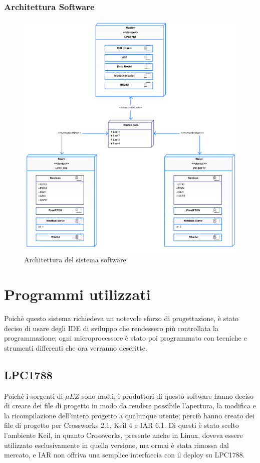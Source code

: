 \documentclass[a4paper,titlepage]{book}
\begin{document}
\subsection{Architettura Software}
\begin{figure}[!h]
\centering
\includegraphics[scale=0.4]{deploy.png}
\caption{Architettura del sistema software}

\end{figure}


\chapter{Programmi utilizzati}

Poichè questo sistema richiedeva un notevole sforzo di progettazione, è stato deciso di usare degli IDE di sviluppo che rendessero più controllata la programmazione; ogni microprocessore è stato poi programmato con tecniche e strumenti differenti che ora verranno descritte. 

\section{LPC1788}

Poiché i sorgenti di $\mu EZ$ sono molti, i produttori di questo software hanno deciso di creare dei file di progetto in modo da rendere possibile l'apertura, la modifica e la ricompilazione dell'intero progetto a qualunque utente; perciò hanno creato dei file di progetto per Crossworks 2.1, Keil 4 e IAR 6.1. Di questi è stato scelto l'ambiente Keil, in quanto Crossworks, presente anche in Linux, doveva essere utilizzato esclusivamente in quella versione, ma ormai è stata rimossa dal mercato, e IAR non offriva una semplice interfaccia con il deploy su LPC1788.
\end{document}
